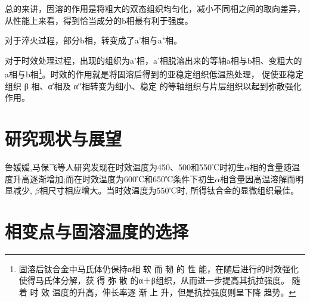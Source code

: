 \documentclass[
class = book,
zihao = -4,
font = noto,
paper = a4paper,
openany
]{easybook}
\begin{document}
总的来讲，固溶的作用是将粗大的双态组织均匀化，减小不同相之间的取向差异，从性能上来看，得到恰当成分的b相最有利于强度。

对于淬火过程，部分b相，转变成了a'相与a"相。

对于时效处理过程，出现的组织为a'相，a'相脱溶出来的等轴a相与b相、变粗大的a相与b相\footnote{固溶后钛合金中马氏体仍保持α相 软 而 韧 的 性 能，在随后进行的时效强化使得马氏体分解，获 得 弥 散 的α＋β组织，从而进一步提高其抗拉强度。 随 着 时 效 温度的升高，伸长率逐 渐 上 升，但是抗拉强度则呈下降 趋势。}。\cite{zhanghaoyinGurongShixiaoduiTC4taihejinzuzhihelixuexingnengdeyingxiang2014}时效的作用就是将固溶后得到的亚稳定组织低温热处理， 促使亚稳定组织 β 相、α′相及 α′′相转变为细小、稳定 的等轴组织与片层组织以起到弥散强化作用。

\section{研究现状与展望}
 鲁媛媛,马保飞等人研究发现在时效温度为450、500和550℃时初生$\alpha $相的含量随温度升高逐渐增加;而在时效温度为600℃和650℃条件下初生$\alpha $相含量因高温溶解而明显减少, $\beta $相尺寸相应增大。当时效温度为550℃时, 所得钛合金的显微组织最佳\cite{timing}。



\section{相变点与固溶温度的选择}
\end{document}

